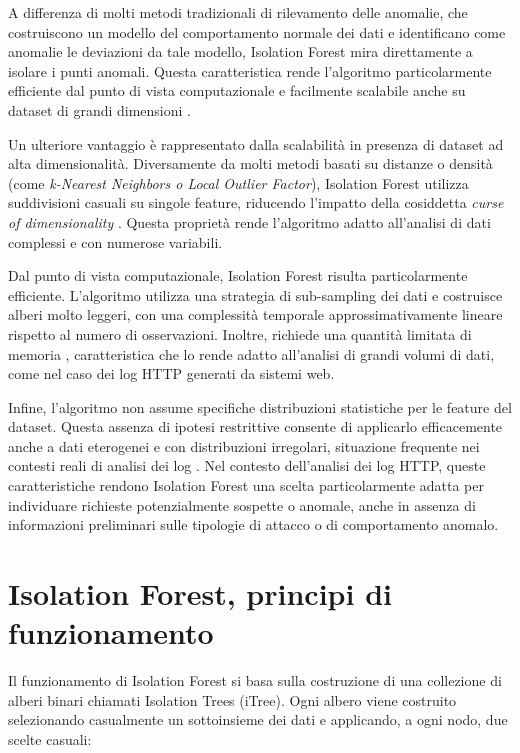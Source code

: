A differenza di molti metodi tradizionali di rilevamento delle anomalie, che costruiscono un modello del comportamento normale dei dati e identificano come anomalie le deviazioni da tale modello, Isolation Forest mira direttamente a isolare i punti anomali. Questa caratteristica rende l’algoritmo particolarmente efficiente dal punto di vista computazionale e facilmente scalabile anche su dataset di grandi dimensioni \parencite{liu2012isolationbased}.

Un ulteriore vantaggio è rappresentato dalla scalabilità in presenza di dataset ad alta dimensionalità. Diversamente da molti metodi basati su distanze o densità (come \emph{k-Nearest Neighbors o Local Outlier Factor}), Isolation Forest utilizza suddivisioni casuali su singole feature, riducendo l’impatto della cosiddetta \emph{curse of dimensionality} \parencite{zimek2012survey}. Questa proprietà rende l’algoritmo adatto all’analisi di dati complessi e con numerose variabili.

Dal punto di vista computazionale, Isolation Forest risulta particolarmente efficiente. L’algoritmo utilizza una strategia di sub-sampling dei dati e costruisce alberi molto leggeri, con una complessità temporale approssimativamente lineare rispetto al numero di osservazioni. Inoltre, richiede una quantità limitata di memoria \parencite{liu2012isolationbased}, caratteristica che lo rende adatto all’analisi di grandi volumi di dati, come nel caso dei log HTTP generati da sistemi web.

Infine, l’algoritmo non assume specifiche distribuzioni statistiche per le feature del dataset. Questa assenza di ipotesi restrittive consente di applicarlo efficacemente anche a dati eterogenei e con distribuzioni irregolari, situazione frequente nei contesti reali di analisi dei log \parencite{chandola2009anomaly}.
Nel contesto dell’analisi dei log HTTP, queste caratteristiche rendono Isolation Forest una scelta particolarmente adatta per individuare richieste potenzialmente sospette o anomale, anche in assenza di informazioni preliminari sulle tipologie di attacco o di comportamento anomalo.

\section{Isolation Forest, principi di funzionamento}
Il funzionamento di Isolation Forest si basa sulla costruzione di una collezione di alberi binari chiamati Isolation Trees (iTree)\parencite{liu2008isolation}. Ogni albero viene costruito selezionando casualmente un sottoinsieme dei dati e applicando, a ogni nodo, due scelte casuali:

